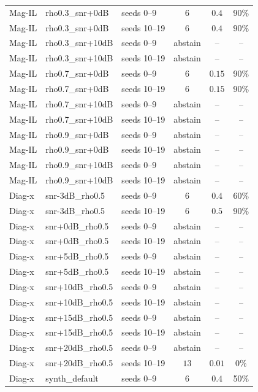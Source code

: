 \begin{longtable}{@{}lllccc@{}}
Mag-IL & rho0.3\_snr+0dB & seeds 0--9 & \(6\) & \(0.4\) & 90\% \\
Mag-IL & rho0.3\_snr+0dB & seeds 10--19 & \(6\) & \(0.4\) & 90\% \\
Mag-IL & rho0.3\_snr+10dB & seeds 0--9 & abstain & -- & -- \\
Mag-IL & rho0.3\_snr+10dB & seeds 10--19 & abstain & -- & -- \\
Mag-IL & rho0.7\_snr+0dB & seeds 0--9 & \(6\) & \(0.15\) & 90\% \\
Mag-IL & rho0.7\_snr+0dB & seeds 10--19 & \(6\) & \(0.15\) & 90\% \\
Mag-IL & rho0.7\_snr+10dB & seeds 0--9 & abstain & -- & -- \\
Mag-IL & rho0.7\_snr+10dB & seeds 10--19 & abstain & -- & -- \\
Mag-IL & rho0.9\_snr+0dB & seeds 0--9 & abstain & -- & -- \\
Mag-IL & rho0.9\_snr+0dB & seeds 10--19 & abstain & -- & -- \\
Mag-IL & rho0.9\_snr+10dB & seeds 0--9 & abstain & -- & -- \\
Mag-IL & rho0.9\_snr+10dB & seeds 10--19 & abstain & -- & -- \\
Diag-x & snr-3dB\_rho0.5 & seeds 0--9 & \(6\) & \(0.4\) & 60\% \\
Diag-x & snr-3dB\_rho0.5 & seeds 10--19 & \(6\) & \(0.5\) & 90\% \\
Diag-x & snr+0dB\_rho0.5 & seeds 0--9 & abstain & -- & -- \\
Diag-x & snr+0dB\_rho0.5 & seeds 10--19 & abstain & -- & -- \\
Diag-x & snr+5dB\_rho0.5 & seeds 0--9 & abstain & -- & -- \\
Diag-x & snr+5dB\_rho0.5 & seeds 10--19 & abstain & -- & -- \\
Diag-x & snr+10dB\_rho0.5 & seeds 0--9 & abstain & -- & -- \\
Diag-x & snr+10dB\_rho0.5 & seeds 10--19 & abstain & -- & -- \\
Diag-x & snr+15dB\_rho0.5 & seeds 0--9 & abstain & -- & -- \\
Diag-x & snr+15dB\_rho0.5 & seeds 10--19 & abstain & -- & -- \\
Diag-x & snr+20dB\_rho0.5 & seeds 0--9 & abstain & -- & -- \\
Diag-x & snr+20dB\_rho0.5 & seeds 10--19 & \(13\) & \(0.01\) & 0\% \\
Diag-x & synth\_default & seeds 0--9 & \(6\) & \(0.4\) & 50\% \\

\end{longtable}
